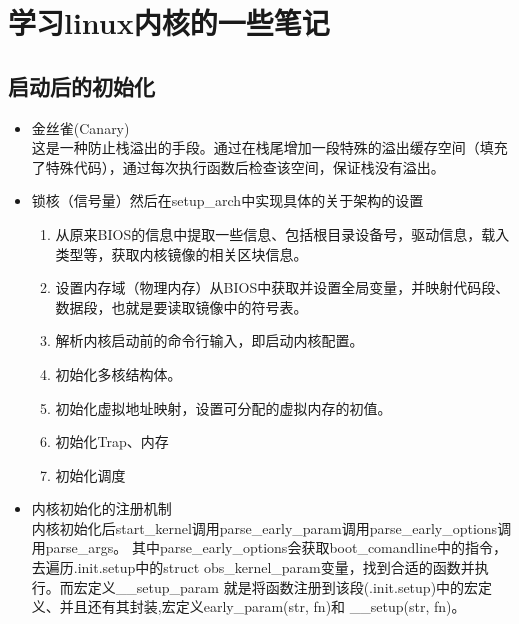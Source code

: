 \section{学习linux内核的一些笔记}
  \subsection{启动后的初始化}
    \begin{itemize}
      \item 金丝雀(Canary)\\
      这是一种防止栈溢出的手段。通过在栈尾增加一段特殊的溢出缓存空间（填充了特殊代码），通过每次执行函数后检查该空间，保证栈没有溢出。
      \item 锁核（信号量）然后在setup\_arch中实现具体的关于架构的设置\\
      	\begin{enumerate}
      		\item[] 从原来BIOS的信息中提取一些信息、包括根目录设备号，驱动信息，载入类型等，获取内核镜像的相关区块信息。
      		\item[] 设置内存域（物理内存）从BIOS中获取并设置全局变量，并映射代码段、数据段，也就是要读取镜像中的符号表。
      		\item[] 解析内核启动前的命令行输入，即启动内核配置。
      		\item[] 初始化多核结构体。
      		\item[]	初始化虚拟地址映射，设置可分配的虚拟内存的初值。
      		\item[] 初始化Trap、内存
      		\item[] 初始化调度
      	\end{enumerate}
      	\item 内核初始化的注册机制\\
      	内核初始化后start\_kernel调用parse\_early\_param调用parse\_early\_options调用parse\_args。
      	其中parse\_early\_options会获取boot\_comandline中的指令，去遍历.init.setup中的struct obs\_kernel\_param变量，找到合适的函数并执行。而宏定义\_\_setup\_param 就是将函数注册到该段(.init.setup)中的宏定义、并且还有其封装,宏定义early\_param(str, fn)和 \_\_setup(str, fn)。	
    \end{itemize}
